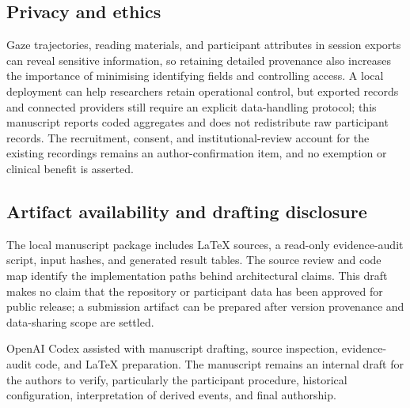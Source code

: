 \subsection{Privacy and ethics}

Gaze trajectories, reading materials, and participant attributes in session exports can reveal sensitive information, so retaining detailed provenance also increases the importance of minimising identifying fields and controlling access. A local deployment can help researchers retain operational control, but exported records and connected providers still require an explicit data-handling protocol; this manuscript reports coded aggregates and does not redistribute raw participant records. The recruitment, consent, and institutional-review account for the existing recordings remains an author-confirmation item, and no exemption or clinical benefit is asserted.

\subsection{Artifact availability and drafting disclosure}

The local manuscript package includes LaTeX sources, a read-only evidence-audit script, input hashes, and generated result tables. The source review and code map identify the implementation paths behind architectural claims. This draft makes no claim that the repository or participant data has been approved for public release; a submission artifact can be prepared after version provenance and data-sharing scope are settled.

OpenAI Codex assisted with manuscript drafting, source inspection, evidence-audit code, and LaTeX preparation. The manuscript remains an internal draft for the authors to verify, particularly the participant procedure, historical configuration, interpretation of derived events, and final authorship.
